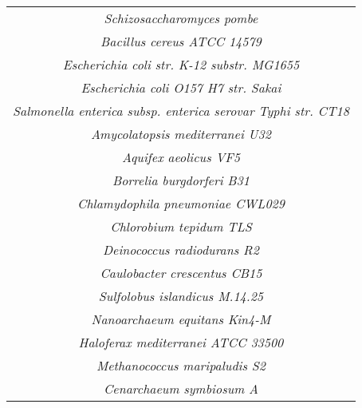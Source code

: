 \begin{longtable}
\begin{tabular}{|c|}
		\textit{Schizosaccharomyces pombe}\\
		\textit{Bacillus cereus ATCC 14579}\\
		\textit{Escherichia coli str. K-12 substr. MG1655}\\
		\textit{Escherichia coli O157 H7 str. Sakai}\\
		\textit{Salmonella enterica subsp. enterica serovar Typhi str. CT18}\\
		\textit{Amycolatopsis mediterranei U32}\\
		\textit{Aquifex aeolicus VF5}\\
		\textit{Borrelia burgdorferi B31}\\
		\textit{Chlamydophila pneumoniae CWL029}\\
		\textit{Chlorobium tepidum TLS}\\
		\textit{Deinococcus radiodurans R2}\\
		\textit{Caulobacter crescentus CB15}\\
		\textit{Sulfolobus islandicus M.14.25}\\
		\textit{Nanoarchaeum equitans Kin4-M}\\
		\textit{Haloferax mediterranei ATCC 33500}\\
		\textit{Methanococcus maripaludis S2}\\
		\textit{Cenarchaeum symbiosum A}\\
	\hline
	\end{tabular}
	\caption{Table of genomes using in transcript binning pipeline.
		Genomes were chosen to be a representative of the sampled diversity of the 
		eukaryotic tree of life as possible}
	\label{tab:appen_genomes}
\end{longtable}

